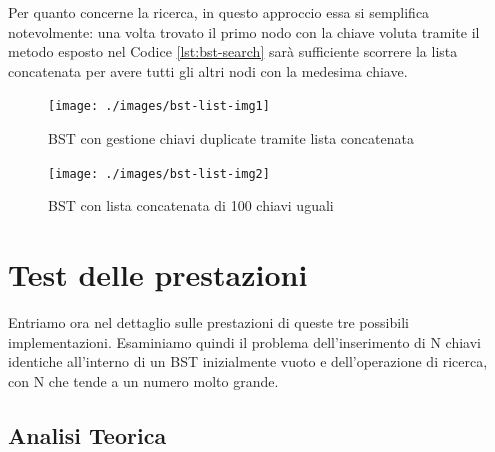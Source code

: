 \documentclass{article}
\begin{document}
Per quanto concerne la ricerca, in questo approccio essa si semplifica notevolmente:
una volta trovato il primo nodo con la chiave voluta tramite il metodo esposto nel Codice \ref{lst:bst-search} sarà sufficiente scorrere la lista concatenata per avere tutti gli altri nodi con la medesima chiave.


\begin{figure}[htbp]
    \centering
  \begin{minipage}{0.48\textwidth}  %
    \centering
    \texttt{[image: ./images/bst-list-img1]}
    \caption{BST con gestione chiavi duplicate tramite lista concatenata}
    \label{fig:bst-list-img1}
  \end{minipage}%
  \hfill  %
  \begin{minipage}{0.48\textwidth}  %
    \centering
    \texttt{[image: ./images/bst-list-img2]}
    \caption{BST con lista concatenata di 100 chiavi uguali}
    \label{fig:bst-list-img2}
  \end{minipage}
\end{figure}




\section{Test delle prestazioni}
Entriamo ora nel dettaglio sulle prestazioni di queste tre possibili implementazioni.
Esaminiamo quindi il problema dell'inserimento di N chiavi identiche all'interno di un BST inizialmente vuoto e dell'operazione di ricerca, con N che tende a un numero molto grande.



\subsection{Analisi Teorica}
\end{document}
